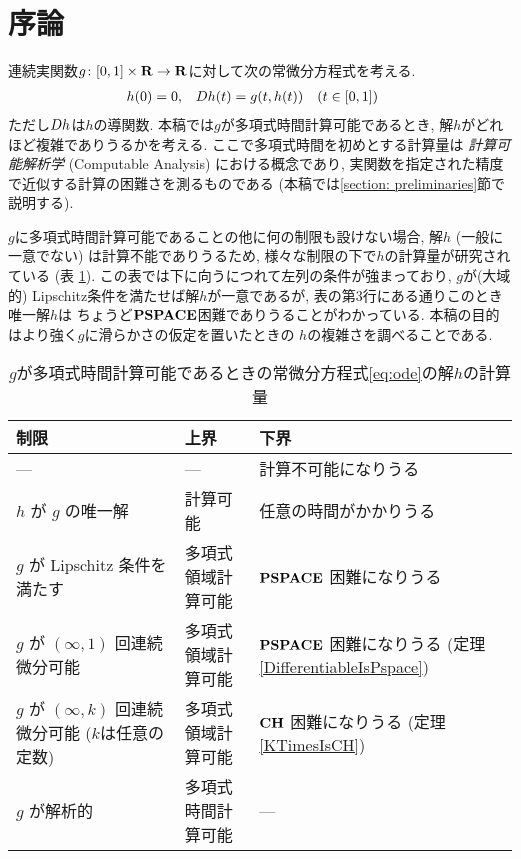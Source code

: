 \section{序論}

連続実関数$g \colon [0,1] \times \mathbf R \to \mathbf R$に対して次の常微分方程式を考える. 
\begin{align}
 \label{eq:ode}
 h(0) & = 0, &
 D h(t) & = g(t,h(t)) \quad (t \in [0,1])
\end{align}
ただし$D h$は$h$の導関数.
本稿では$g$が多項式時間計算可能であるとき, 
解$h$がどれほど複雑でありうるかを考える.
ここで多項式時間を初めとする計算量は
\emph{計算可能解析学} (Computable Analysis) 
\cite{weihrauch00:_comput_analy}における概念であり, 
実関数を指定された精度で近似する計算の困難さを測るものである
(本稿では\ref{section: preliminaries}節で説明する). 

$g$に多項式時間計算可能であることの他に何の制限も設けない場合, 
解$h$ (一般に一意でない) は計算不能でありうるため,
様々な制限の下で$h$の計算量が研究されている (表 \ref{table:related}).
この表では下に向うにつれて左列の条件が強まっており, 
$g$が(大域的) Lipschitz条件を満たせば解$h$が一意であるが, 
表の第3行にある通りこのとき唯一解$h$は
ちょうど$\mathbf{PSPACE}$困難でありうることがわかっている\cite{kawamura2010lipschitz}. 
本稿の目的はより強く$g$に滑らかさの仮定を置いたときの
$h$の複雑さを調べることである. 

\begin{table}
\renewcommand\arraystretch{1.3}
\begin{center}
 \caption{$g$が多項式時間計算可能であるときの常微分方程式\eqref{eq:ode}の解$h$の計算量}
 \label{table:related}
 \begin{tabular}{lll}
  制限 & 上界 & 下界 \\
  \hline
   --- & --- & 計算不可能になりうる \cite{pour1979computable} \\
  $h$ が $g$ の唯一解 & 計算可能 \cite{coddington1955theory}
  & 任意の時間がかかりうる \cite{ko1983computational, miller1970recursive} \\
  $g$ が Lipschitz 条件を満たす & 多項式領域計算可能 \cite{ko1983computational}
      &	$\mathbf{PSPACE}$ 困難になりうる \cite{kawamura2010lipschitz}\\
  $g$ が $(\infty, 1)$ 回連続微分可能 & 多項式領域計算可能 & \parbox[t]{14zw}{$\mathbf{PSPACE}$ 困難になりうる\\{}(定理\ref{DifferentiableIsPspace})} \\
  \parbox[t]{14zw}{$g$ が $(\infty, k)$ 回連続微分可能\\{}($k$は任意の定数)}
  & 多項式領域計算可能 & \parbox[t]{14zw}{$\mathbf{CH}$ 困難になりうる\\{}(定理\ref{KTimesIsCH})} \\
  $g$ が解析的 
  & 多項式時間計算可能 \cite{muller1987uniform, ko1988computing, kawamura2010complexity} 
  & ---
 \end{tabular}
\end{center}
\end{table}

